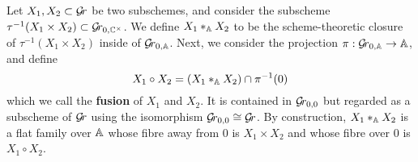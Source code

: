 \documentclass[draft]{article}
\begin{document}
Let $ X_1, X_2 \subset \Gr$ be two subschemes, and consider the subscheme $ \tau^{-1}(X_1 \times X_2) \subset \Gr_{0, \CC^\times} $.
% 
% 
We define $ X_1 \ast_{\AA} X_2 $ to be the scheme-theoretic closure of $  \tau^{-1}(X_1 \times X_2) $ inside of $ \Grbd $.  
Next, we consider the projection $ \pi: \Grbd \rightarrow \AA $, and define 
\begin{equation*}
    X_1 \circ X_2 = (X_1 \ast_\AA X_2) \cap \pi^{-1}(0) 
\end{equation*}
which we call the \textbf{fusion} of $ X_1 $ and $X_2$. It is contained in $\Gr_{0,0}$ but regarded as a subscheme of $ \Gr $ using {the isomorphism} $\Gr_{0,0} \cong \Gr $. 
% 
By construction, 
$X_1 \ast_{\AA} X_2 $ is a flat family over $\AA$ whose fibre away from $0$ is $X_1 \times X_2$ and whose fibre over $ 0$ is $ X_1 \circ X_2$.  


\end{document}
